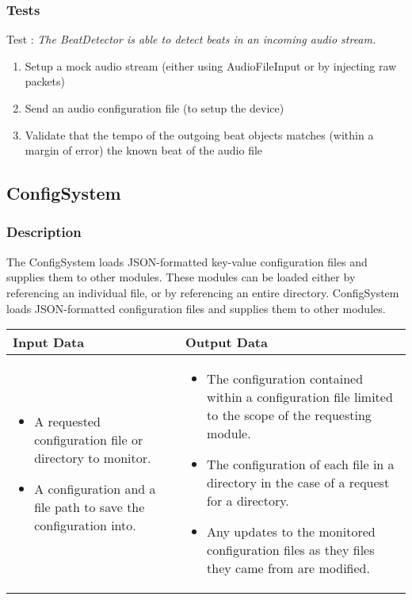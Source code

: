 \documentclass[a4paper]{article}
\newcounter{testcounter}
\newcommand{\test}[1] {
	\stepcounter{testcounter}
	Test \arabic{testcounter}: \emph{#1}}
\begin{document}
		\subsubsection{Tests}
			\test{The BeatDetector is able to detect beats in an incoming audio stream.}
			\begin{enumerate}
				\item Setup a mock audio stream (either using AudioFileInput or by injecting raw packets)
				\item Send an audio configuration file (to setup the device)
				\item Validate that the tempo of the outgoing beat objects matches (within a margin of error) the known beat of the audio file
			\end{enumerate}

	\subsection{ConfigSystem}
		\subsubsection{Description}
			The ConfigSystem loads JSON-formatted key-value configuration files and supplies them to other modules.
			These modules can be loaded either by referencing an individual file, or by referencing an entire directory.
			ConfigSystem loads JSON-formatted configuration files and supplies them to other modules.
			
			\begin{tabular}{p{5cm}|p{5cm}}
    			Input Data & Output Data \\ \hline
				\begin{itemize}
					\item A requested configuration file or directory to monitor.
					\item A configuration and a file path to save the configuration into.
				\end{itemize}
				&
				\begin{itemize}
					\item The configuration contained within a configuration file limited to the scope of the requesting module.
					\item The configuration of each file in a directory in the case of a request for a directory.
					\item Any updates to the monitored configuration files as they files they came from are modified.
				\end{itemize}
    		\end{tabular}
\end{document}
